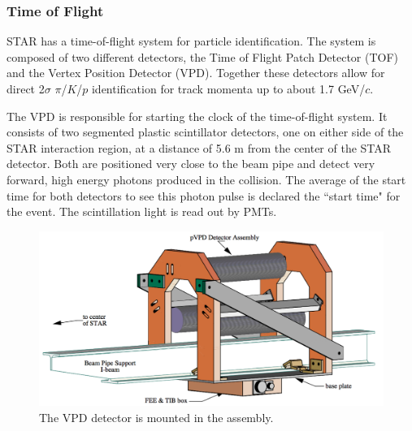 \documentclass[letterpaper, abstract = on,listof=totoc, bibliography=totoc]{scrreprt}
\begin{document}
\FloatBarrier

\subsubsection[TOF]{Time of Flight}

STAR has a time-of-flight system for particle identification. The system is composed of two different detectors, the Time of Flight Patch Detector (TOF) and the Vertex Position Detector (VPD).  Together these detectors allow for direct 2$\sigma$ $\pi$/$K$/$p$ identification for track momenta up to about 1.7 GeV/$c$.

The VPD is responsible for starting the clock of the time-of-flight system. It consists of two segmented plastic scintillator detectors, one on either side of the STAR interaction region, at a distance of 5.6 m from the center of the STAR detector. Both are positioned very close to the beam pipe and detect very forward, high energy photons produced in the collision. The average of the start time for both detectors to see this photon pulse is declared the ``start time" for the event. The scintillation light is read out by PMTs. 


\begin{figure}
\begin{center}
\includegraphics[width = .6\textwidth]{vpdAssembly}
\caption[VPD Assembly]{The VPD detector is mounted in the assembly.}
\label{fig:vpdAssembly}
\end{center}
\end{figure}
\end{document}
